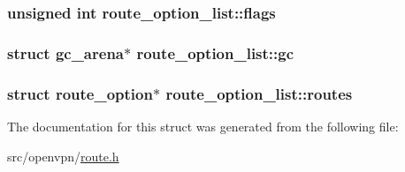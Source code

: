 \subsubsection[{flags}]{\setlength{\rightskip}{0pt plus 5cm}unsigned int route\+\_\+option\+\_\+list\+::flags}\label{structroute__option__list_ad9af4582edb27d213868f153bfe0af7f}
\hypertarget{structroute__option__list_ac768396edd7ff53282f123d4e8508c0d}{}
\subsubsection[{gc}]{\setlength{\rightskip}{0pt plus 5cm}struct {\bf gc\+\_\+arena}$\ast$ route\+\_\+option\+\_\+list\+::gc}\label{structroute__option__list_ac768396edd7ff53282f123d4e8508c0d}
\hypertarget{structroute__option__list_adf288d5d22a4271d7b2c3a409962fbb2}{}
\subsubsection[{routes}]{\setlength{\rightskip}{0pt plus 5cm}struct {\bf route\+\_\+option}$\ast$ route\+\_\+option\+\_\+list\+::routes}\label{structroute__option__list_adf288d5d22a4271d7b2c3a409962fbb2}


The documentation for this struct was generated from the following file\+:\begin{DoxyCompactItemize}
\item 
src/openvpn/\hyperlink{route_8h}{route.\+h}\end{DoxyCompactItemize}
